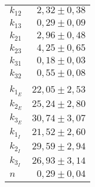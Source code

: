 \begin{tabular}{lr}
\toprule
$k_{12}$    &$2,32 \pm0,38$ \\
$k_{13}$    &$0,29 \pm0,09$ \\
$k_{21}$    &$2,96 \pm0,48$ \\
$k_{23}$    &$4,25 \pm0,65$ \\
$k_{31}$    &$0,18 \pm0,03$ \\
$k_{32}$    &$0,55 \pm0,08$ \\
&\\
$k_{1_E}$   &$22,05\pm2,53$ \\
$k_{2_E}$   &$25,24\pm2,80$ \\
$k_{3_E}$   &$30,74\pm3,07$ \\
$k_{1_I}$   &$21,52\pm2,60$ \\
$k_{2_I}$   &$29,59\pm2,94$ \\
$k_{3_I}$   &$26,93\pm3,14$ \\
\midrule
$n$ &    $0,29\pm0,04$ \\
\bottomrule
\end{tabular}
